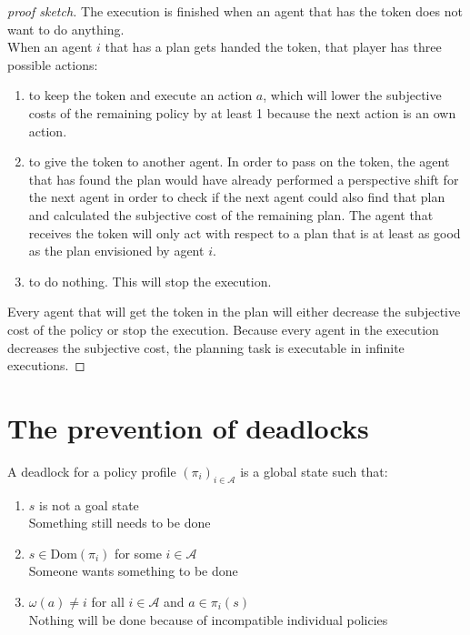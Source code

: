\begin{proof}[proof sketch]
  The execution is finished when an agent that has the token does not want to do anything. \\
  When an agent $i$ that has a plan gets handed the token, that player has three possible actions:
  \begin{enumerate}
    \item to keep the token and execute an action $a$, which will lower the subjective costs of the remaining policy by at least 1 because the next action is an own action.

    \item to give the token to another agent. In order to pass on the token, the agent that has found the plan would have already performed a perspective shift for the next agent in order to check if the next agent could also find that plan and calculated the subjective cost of the remaining plan. The agent that receives the token will only act with respect to a plan that is at least as good as the plan envisioned by agent $i$.


    \item to do nothing. This will stop the execution.

  \end{enumerate}
  Every agent that will get the token in the plan will either decrease the subjective cost of the policy or stop the execution. Because every agent in the execution decreases the subjective cost, the planning task is executable in infinite executions.
\end{proof}


\section{The prevention of deadlocks}

A deadlock for a policy profile $(\pi_i)_{i \in \mathcal{A}}$ is a global state such that:
\begin{enumerate}
  \item $s$ is not a goal state \\
    Something still needs to be done
  \item $s \in \text{Dom}(\pi_i)$ for some $i \in \mathcal{A}$ \\
    Someone wants something to be done
  \item $\omega(a) \neq i$ for all $i \in \mathcal{A}$ and $a \in \pi_i(s)$ \\
    Nothing will be done because of incompatible individual policies
\end{enumerate}

